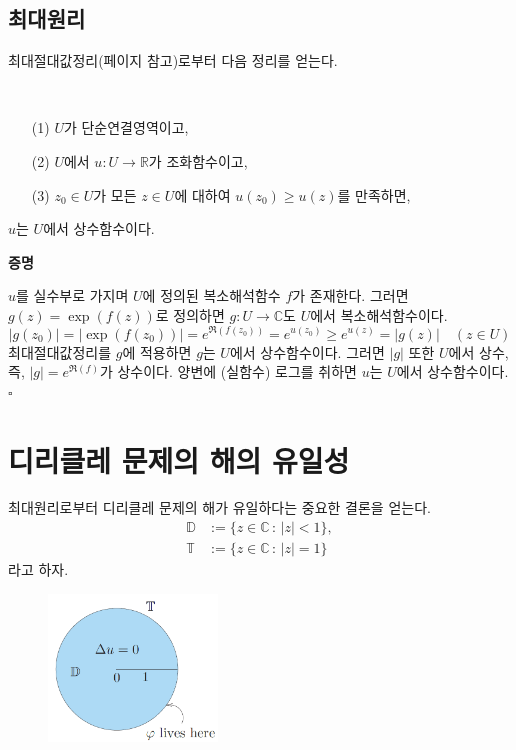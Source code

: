 \subsection{최대원리}

최대절대값정리(\pageref{sec-4-6}페이지 참고)로부터 %
다음 정리를 얻는다.

\begin{salt_theorem} [최대원리] \label{thm-5-4}
\
\begin{itemize}
\item[(1)] $U$가 단순연결영역이고,
\item[(2)] $U$에서 $u:U\to\mathbb R$가 조화함수이고,
\item[(3)] $z_0\in U$가 모든 $z\in U$에 대하여 $u(z_0) \ge u(z)$를 만족하면,
\end{itemize}
$u$는 $U$에서 상수함수이다.
\end{salt_theorem}

{\bf 증명}

$u$를 실수부로 가지며 $U$에 정의된 복소해석함수 $f$가 존재한다.
그러면 $g(z)=\exp(f(z))$로 정의하면
$g:U\to\mathbb C$도 $U$에서 복소해석함수이다.
\[
|g(z_0)| = |\exp(f(z_0))| = e^{\Re(f(z_0))}
= e^{u(z_0)} \ge e^{u(z)} = |g(z)|
\quad (z\in U)
\]
최대절대값정리를 $g$에 적용하면
$g$는 $U$에서 상수함수이다.
그러면 $|g|$ 또한 $U$에서 상수, 즉, $|g| = e^{\Re(f)}$가 상수이다.
양변에 (실함수) 로그를 취하면 $u$는  $U$에서 상수함수이다.
\hfill $\square$

\section{디리클레 문제의 해의 유일성}

최대원리로부터 디리클레 문제의 해가 유일하다는 중요한 결론을 얻는다.
\begin{align*}
\mathbb D&:= \{ z\in\mathbb C\,:\, |z|<1\},\\
\mathbb T&:= \{ z\in\mathbb C\,:\, |z|=1\}
\end{align*}
라고 하자.

\begin{figure}[h!]
\begin{center}
\includegraphics[width=0.4\textwidth]{./SaltChapter/fig-5-0-2}
\end{center}
\end{figure}

